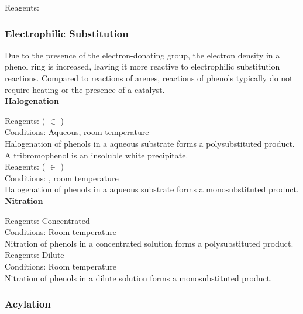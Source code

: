 \documentclass[../main]{subfiles}
\begin{document}
	Reagents:  \\


	\subsubsection{Electrophilic Substitution}

	Due to the presence of the electron-donating  group, the electron density in a phenol ring is increased, leaving it more reactive to electrophilic substitution reactions. Compared to reactions of arenes, reactions of phenols typically do not require heating or the presence of a catalyst. \\

	\noindent \textbf{Halogenation}

	Reagents:  ( \(\in\) ) \\
	Conditions:  Aqueous, room temperature\\

	Halogenation of phenols in a aqueous substrate forms a polysubstituted product. A tribromophenol is an insoluble white precipitate. \\

	Reagents:  ( \(\in\) ) \\
	Conditions: , room temperature\\

	Halogenation of phenols in a aqueous substrate forms a monosubstituted product. \\

	\noindent \textbf{Nitration}

	Reagents: Concentrated  \\
	Conditions: Room temperature\\

	Nitration of phenols in a concentrated solution forms a polysubstituted product. \\

	Reagents: Dilute  \\
	Conditions: Room temperature\\

	Nitration of phenols in a dilute solution forms a monosubstituted product. \\

	\subsubsection{Acylation}
\end{document}
